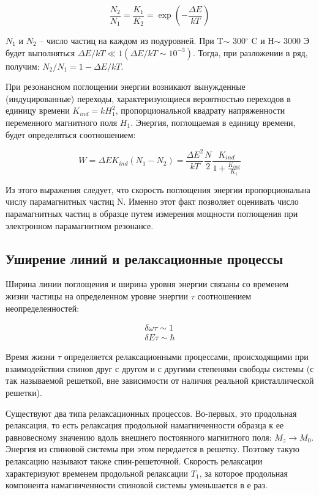 \documentclass{article}
\begin{document}
\begin{equation}
\frac{N_{2}}{N_{1}}=\frac{K_{1}}{K_{2}}=\exp\left( -\frac{ \Delta E}{kT} \right)
\end{equation}

$N_1$ и $N_2$ – число частиц на каждом из подуровней. При T$ \sim $ 300$ ^{\circ} $ C и Н$ \sim $ 3000 Э будет выполняться $ \Delta E/kT \ll 1 ( \Delta E/kT \sim 10^{-3})$. Тогда, при разложении в ряд, получим: $N_2/N_1 = 1 - \Delta E/kT $.

При резонансном поглощении энергии возникают вынужденные (индуцированные) переходы, характеризующиеся вероятностью переходов в единицу времени  $K_{ind}=kH_{1}^{2}$, пропорциональной квадрату напряженности переменного магнитного поля $H_1$. Энергия, поглощаемая в единицу времени, будет определяться соотношением:

\begin{equation}
W= \Delta EK_{ind} \left( N_{1}-N_{2} \right) =\frac{ \Delta E^{2}}{kT}\frac{N}{2}\frac{K_{ind}}{1+\frac{K_{ind}}{K_{1}}}
\end{equation}

Из этого выражения следует, что скорость поглощения энергии пропорциональна числу парамагнитных частиц N. Именно этот факт позволяет оценивать число парамагнитных частиц в образце путем измерения мощности поглощения при электронном парамагнитном резонансе.

\subsection{Уширение линий и релаксационные процессы}

Ширина линии поглощения и ширина уровня энергии связаны со временем жизни частицы на определенном уровне энергии $\tau$  соотношением неопределенностей:

\begin{equation}
\begin{aligned}
\delta\omega\tau \sim 1 \\
\delta E\tau \sim \hbar
\end{aligned}
\end{equation}

Время жизни $\tau$  определяется релаксационными процессами, происходящими при взаимодействии спинов друг с другом и с другими степенями свободы системы (с так называемой решеткой, вне зависимости от наличия реальной кристаллической решетки). \par

Существуют два типа релаксационных процессов. Во-первых, это продольная релаксация, то есть релаксация продольной намагниченности образца к ее равновесному значению вдоль внешнего постоянного магнитного поля: $M_z \rightarrow M_0 $. Энергия из спиновой системы при этом передается в решетку. Поэтому такую релаксацию называют также спин-решеточной. Скорость релаксации характеризуют временем продольной релаксации $T_1$, за которое продольная компонента намагниченности спиновой системы уменьшается в е раз.
\end{document}
